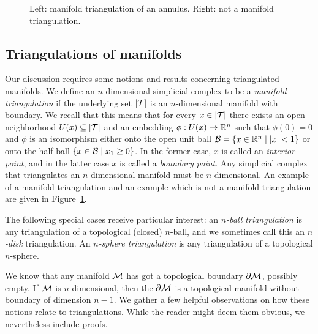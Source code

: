 \documentclass[10pt,a4paper]{article}
\begin{document}
\begin{figure}[h]
\caption{Left: manifold triangulation of an annulus. Right: not a manifold triangulation.}
\label{figure:not_manifold_triang}
\end{figure}


\subsection{Triangulations of manifolds}\label{subsection:manifoldtriangulation}

Our discussion requires some notions and results concerning triangulated manifolds. 
We define an $n$-dimensional simplicial complex to be a \emph{manifold triangulation} if the underlying set $\left| {\mathcal T} \right|$ is an $n$-dimensional manifold with boundary.
We recall that this means that for every $x \in \left| {\mathcal T} \right|$
there exists an open neighborhood $U(x) \subseteq \left| {\mathcal T} \right|$ and an embedding $\phi : U(x) \rightarrow {\mathbb R}^{n}$
such that $\phi(0) = 0$ and $\phi$ is an isomorphism either onto the open unit ball $\calB = \{ x \in \bbR^{n} \suchthat |x| < 1 \}$
or onto the half-ball $\{ x \in \calB \suchthat x_1 \geq 0 \}$.
In the former case, $x$ is called an \emph{interior point}, and in the latter case $x$ is called a \emph{boundary point}. 
Any simplicial complex that triangulates an $n$-dimensional manifold must be $n$-dimensional. 
An example of a manifold triangulation and an example which is not a manifold triangulation are given in Figure~\ref{figure:not_manifold_triang}.

The following special cases receive particular interest:
an \textit{$n$-ball triangulation} is any triangulation of a topological (closed) $n$-ball, and we sometimes call this an \textit{$n$-disk} triangulation.
An \textit{$n$-sphere triangulation} is any triangulation of a topological $n$-sphere. 


We know that any manifold ${\mathcal M}$ has got a topological boundary $\partial{\mathcal M}$, possibly empty. 
If ${\mathcal M}$ is $n$-dimensional, then the $\partial{\mathcal M}$ is a topological manifold without boundary of dimension $n-1$. 
We gather a few helpful observations on how these notions relate to triangulations.
While the reader might deem them obvious, we nevertheless include proofs. 
\end{document}
